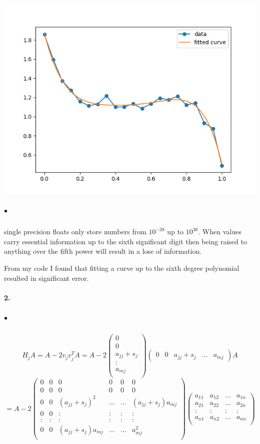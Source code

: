 \documentclass[12pt]{article}
\begin{document}
    	\includegraphics[scale=0.7]{Figure_2}
    	
    \subparagraph{$\bullet$}
    	single precision floats only store numbers from $10^{-38}$ up to $10^{38}$. When values carry essential information up to the sixth significant digit then being raised to anything over the fifth power will result in a lose of information. 
    	
    	From my code I found that fitting a curve up to the sixth degree polynomial resulted in significant error. 
    	
    
\paragraph{2.}
	\subparagraph{$\bullet$}
		\[
		H_jA = A - 2v_jv_j^TA = A - 2
		\left(\begin{matrix}
		0 \\
		0 \\
		a_{jj} + s_j \\
		: \\
		a_{mj} \\
		\end{matrix}\right)
		\left(\begin{matrix}
		0 & 0 & a_{jj} + s_j & ... & a_{mj}
		\end{matrix}\right)
		A
		\]\[
		= A - 2
		\left(\begin{matrix}
		0 & 0 & 0 & 0 & 0 & 0\\
		0 & 0 & 0 & 0 & 0 & 0\\
		0 & 0 & (a_{jj} + s_j)^2 & ... & ... & (a_{jj} + s_j)a_{mj} \\
		0 & 0 & : & : & : & : \\
		: & : & : & : & : & : \\
		0 & 0 & (a_{jj} + s_j)a_{mj} & ... & ... & a_{mj}^2 \\
		\end{matrix}\right)
		\left(\begin{matrix}
		a_{11} & a_{12} & ... & a_{1n} \\
		a_{21} & a_{22} & ... & a_{2n} \\
		: & : & : & : \\
		a_{n1} & a_{n2} & ... & a_{nn} \\
		\end{matrix}\right)
		\]
		
\end{document}
